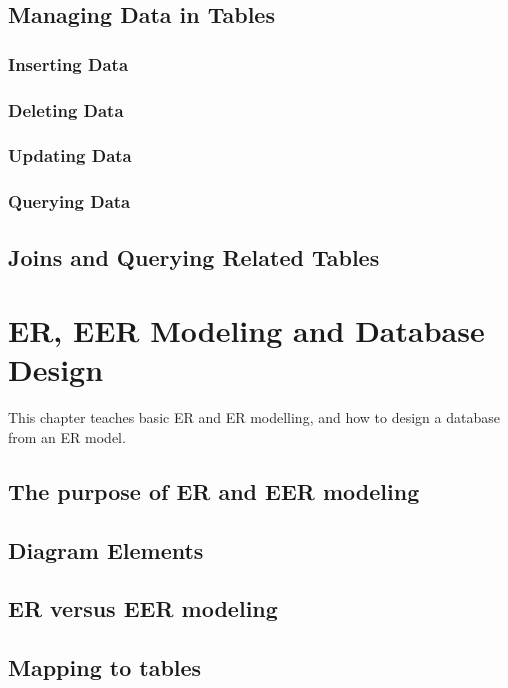 \section{Managing Data in Tables}

\subsection{Inserting Data}

\subsection{Deleting Data}

\subsection{Updating Data}

\subsection{Querying Data}

\section{Joins and Querying Related Tables}

\chapter{ER, EER Modeling and Database Design}
\label{chap:relational:eer-modeling-and-database-design}
This chapter teaches basic ER and ER modelling, and how to design a database from an ER model.

\section{The purpose of ER and EER modeling}
\section{Diagram Elements}
\section{ER versus EER modeling}
\section{Mapping to tables}

